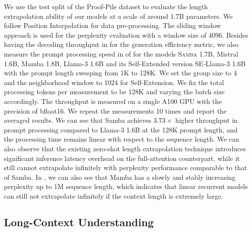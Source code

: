\documentclass{article}
\begin{document}


We use the test split of the Proof-Pile \citep{proofpile} dataset to evaluate the length extrapolation ability of our models at a scale of around 1.7B parameters. We follow Position Interpolation \citep{chen2023extending} for data pre-processing. The sliding window approach \citep{press2021train} is used for the perplexity evaluation with a window size of 4096. 
Besides having the decoding throughput in  for the generation efficiency metric, we also measure the prompt processing speed in  of  for the models \textsc{Samba} 1.7B, Mistral 1.6B, Mamba 1.8B, Llama-3 1.6B and its Self-Extended \citep{jin2024llm} version SE-Llama-3 1.6B with the prompt length sweeping from 1K to 128K. We set the group size to 4 and the neighborhood window to 1024 for Self-Extension.
We fix the total processing tokens per measurement to be 128K and varying the batch size accordingly. 
The throughput is measured on a single A100 GPU with the precision of bfloat16. We repeat the measurements 10 times and report the averaged results. 
We can see that Samba achieves $3.73\times$ higher throughput in prompt processing compared to Llama-3 1.6B at the 128K prompt length, and the processing time remains linear with respect to the sequence length. We can also observe that the existing zero-shot length extrapolation technique introduces significant inference latency overhead on the full-attention counterpart, while it still cannot extrapolate infinitely with perplexity performance comparable to that of Samba. In , we can also see that Mamba has a slowly and stably increasing perplexity up to 1M sequence length, which indicates that linear recurrent models can still not extrapolate infinitely if the context length is extremely large.



\subsection{Long-Context Understanding}
\end{document}
